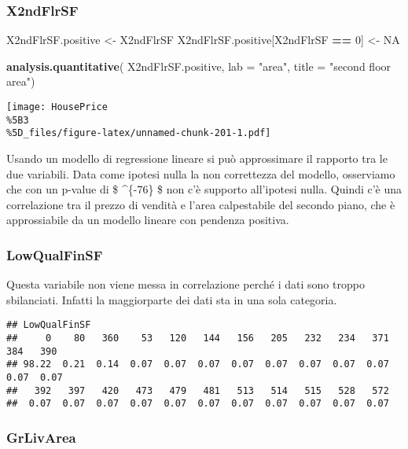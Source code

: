 \documentclass[
]{article}
\newenvironment{Shaded}{\begin{snugshade}}{\end{snugshade}}
\newcommand{\AttributeTok}[1]{\textcolor[rgb]{0.13,0.29,0.53}{#1}}
\newcommand{\ConstantTok}[1]{\textcolor[rgb]{0.56,0.35,0.01}{#1}}
\newcommand{\DecValTok}[1]{\textcolor[rgb]{0.00,0.00,0.81}{#1}}
\newcommand{\FunctionTok}[1]{\textcolor[rgb]{0.13,0.29,0.53}{\textbf{#1}}}
\newcommand{\NormalTok}[1]{#1}
\newcommand{\OtherTok}[1]{\textcolor[rgb]{0.56,0.35,0.01}{#1}}
\newcommand{\SpecialCharTok}[1]{\textcolor[rgb]{0.81,0.36,0.00}{\textbf{#1}}}
\newcommand{\StringTok}[1]{\textcolor[rgb]{0.31,0.60,0.02}{#1}}
\begin{document}
\subsubsection{X2ndFlrSF}\label{x2ndflrsf-1}

\begin{Shaded}
\begin{Highlighting}[]
\NormalTok{X2ndFlrSF.positive }\OtherTok{\textless{}{-}}\NormalTok{ X2ndFlrSF}
\NormalTok{X2ndFlrSF.positive[X2ndFlrSF }\SpecialCharTok{==} \DecValTok{0}\NormalTok{] }\OtherTok{\textless{}{-}} \ConstantTok{NA}

\FunctionTok{analysis.quantitative}\NormalTok{(}
\NormalTok{    X2ndFlrSF.positive,}
    \AttributeTok{lab =} \StringTok{"area"}\NormalTok{,}
    \AttributeTok{title =} \StringTok{"second floor area"}\NormalTok{)}
\end{Highlighting}
\end{Shaded}

\texttt{[image: HousePrice\\\%5B3\\\%5D\_files/figure-latex/unnamed-chunk-201-1.pdf]}

Usando un modello di regressione lineare si può approssimare il rapporto
tra le due variabili. Data come ipotesi nulla la non correttezza del
modello, osserviamo che con un p-value di \$ \^{}\{-76\} \$
non c'è supporto all'ipotesi nulla. Quindi c'è una correlazione tra il
prezzo di vendità e l'area calpestabile del secondo piano, che è
approssiabile da un modello lineare con pendenza positiva.

\subsubsection{LowQualFinSF}\label{lowqualfinsf-1}

Questa variabile non viene messa in correlazione perché i dati sono
troppo sbilanciati. Infatti la maggiorparte dei dati sta in una sola
categoria.

\begin{verbatim}
## LowQualFinSF
##     0    80   360    53   120   144   156   205   232   234   371   384   390 
## 98.22  0.21  0.14  0.07  0.07  0.07  0.07  0.07  0.07  0.07  0.07  0.07  0.07 
##   392   397   420   473   479   481   513   514   515   528   572 
##  0.07  0.07  0.07  0.07  0.07  0.07  0.07  0.07  0.07  0.07  0.07
\end{verbatim}

\subsubsection{GrLivArea}\label{grlivarea-1}
\end{document}
